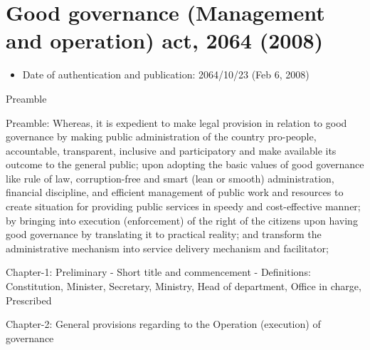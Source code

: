 \documentclass[
  openany]{book}
\providecommand{\tightlist}{%
  \setlength{\itemsep}{0pt}\setlength{\parskip}{0pt}}
\begin{document}
\hypertarget{good-governance-management-and-operation-act-2064-2008}{%
\section{Good governance (Management and operation) act, 2064 (2008)}\label{good-governance-management-and-operation-act-2064-2008}}

\begin{itemize}
\tightlist
\item
  Date of authentication and publication: 2064/10/23 (Feb 6, 2008)
\end{itemize}

Preamble

Preamble: Whereas, it is expedient to make legal provision in relation to good governance by making public administration of the country pro-people, accountable, transparent, inclusive and participatory and make available its outcome to the general public; upon adopting the basic values of good governance like rule of law, corruption-free and smart (lean or smooth) administration, financial discipline, and efficient management of public work and resources to create situation for providing public services in speedy and cost-effective manner; by bringing into execution (enforcement) of the right of the citizens upon having good governance by translating it to practical reality; and transform the administrative mechanism into service delivery mechanism and facilitator;

Chapter-1: Preliminary
- Short title and commencement
- Definitions: Constitution, Minister, Secretary, Ministry, Head of department, Office in charge, Prescribed

Chapter-2: General provisions regarding to the Operation (execution) of governance
\end{document}
